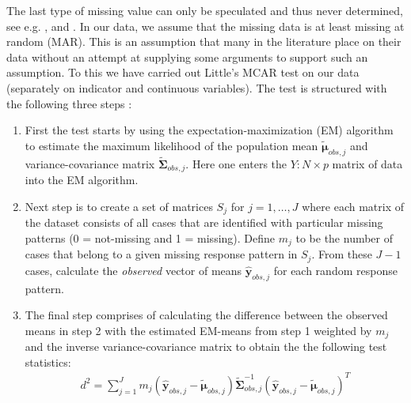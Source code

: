 \documentclass[../thesis.tex]{subfiles}
\begin{document}
\noindent The last type of missing value can only be speculated and thus never determined, see e.g. \cite{rubin1976inference}, \cite{schafer2002missing} and \cite{moons2006using}. In our data, we assume that the missing data is at least missing at random (MAR). This is an assumption that many in the literature place on their data without an attempt at supplying some arguments to support such an assumption. To this we have carried out Little's MCAR test \citep{little1988test} on our data (separately on indicator and continuous variables). The test is structured with the following three steps : 
\begin{enumerate}[label=(\roman*)]
    \item First the test starts by using the expectation-maximization (EM) algorithm \citep{dempster1977maximum} to estimate the maximum likelihood of the population mean $\bm{\tilde{\mu}}_{obs, j}$ and variance-covariance matrix $\bm{\tilde{\Sigma}}_{obs,j}$. Here one enters the $Y:N\times p$ matrix of data into the EM algorithm.
    \item Next step is to create a set of matrices $S_j$ for $j = 1, \hdots, J$ where each matrix of the dataset consists of all cases that are identified with particular missing patterns (0 = not-missing and 1 = missing). Define $m_j$ to be the number of cases that belong to a given missing response pattern in $S_j$. From these $J-1$ cases, calculate the \textit{observed} vector of means $\bm{\hat{y}}_{obs, j}$ for each random response pattern. 
    \item The final step comprises of calculating the difference between the observed means in step 2 with the estimated EM-means from step 1 weighted by $m_j$ and the inverse variance-covariance matrix to obtain the the following test statistics:
    \begin{align}
        d^2 = \sum_{j=1}^J m_j \left(\bm{\hat{y}}_{obs, j} -  \bm{\tilde{\mu}}_{obs, j}\right)\bm{\tilde{\Sigma}}_{obs,j}^{-1}\left(\bm{\hat{y}}_{obs, j} -  \bm{\tilde{\mu}}_{obs, j}\right)^T
    \end{align}
\end{enumerate}
\end{document}
